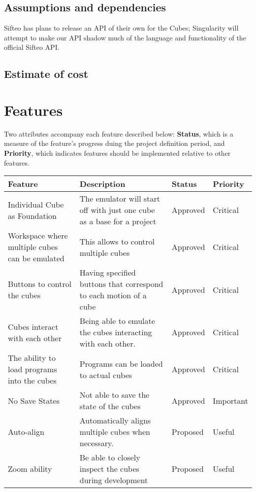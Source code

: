\documentclass[12pt]{article}
\begin{document}
              \subsection{Assumptions and dependencies}
              Sifteo has plans to release an API of their own for the Cubes; Singularity will attempt to make our API shadow much of the language and functionality of the official Sifteo API. 

              \subsection{Estimate of cost}
\clearpage

\section{Features}
Two attributes accompany each feature described below: \textbf{Status}, which is a measure of the feature's progress duing the project definition period, and \textbf{Priority}, which indicates features should be implemented relative to other features.
    \begin{table}[h]
      \begin{tabular}{p{1.5in} | p{1.75in} | p{1in} | p{1in}}
        \textbf{Feature} & \textbf{Description} & \textbf{Status} & \textbf{Priority} \\ \hline

        Individual Cube as Foundation &
        The emulator will start off with just one cube as a base for a project &
        Approved &
        Critical \\ \hline

        Workspace where multiple cubes can be emulated &
        This allows to control multiple cubes &
        Approved &
        Critical \\ \hline

        Buttons to control the cubes &
        Having specified buttons that correspond to each motion of a cube &
        Approved &
        Critical \\ \hline

        Cubes interact with each other &
        Being able to emulate the cubes interacting with each other. &
        Approved &
        Critical \\ \hline

        The ability to load programs into the cubes &
        Programs can be loaded to actual cubes &
        Approved &
        Critical \\ \hline

        No Save States &
        Not able to save the state of the cubes &
        Approved &
        Important \\ \hline

        Auto-align &
        Automatically aligns multiple cubes when necessary. &
        Proposed &
        Useful \\ \hline

        Zoom ability &
        Be able to closely inspect the cubes during development &
        Proposed &
        Useful
      \end{tabular}
    \end{table}
\end{document}
